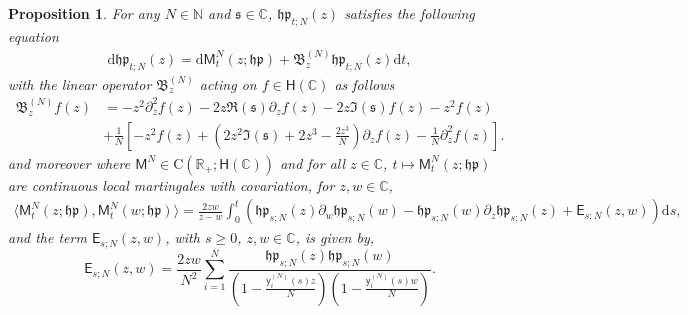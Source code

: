 \documentclass[]{article}
\newtheorem{prop}[thm]{Proposition}
\begin{document}
\begin{prop}\label{PropHPcharpolySDE}
    For any $N\in\mathbb{N}$ and $\mathfrak{s}\in\mathbb{C}$,
    $\mathfrak{hp}_{t;N}(z)$ satisfies the following equation
\begin{align}
\mathrm{d}\mathfrak{hp}_{t;N}(z)
    =
\mathrm{d}\mathsf{M}^N_t(z;\mathfrak{hp})
       +\mathfrak{B}^{(N)}_z\mathfrak{hp}_{t;N}(z)\mathrm{d}t,
\end{align}
with the linear operator $\mathfrak{B}^{(N)}_z$ acting on $f\in \mathsf{H}(\mathbb{C})$ as follows
\begin{align}
\mathfrak{B}^{(N)}_zf(z)&=-z^2\partial_z^2f(z)-2z\Re(\mathfrak{s})\partial_zf(z)-2z\Im(\mathfrak{s})f(z)-z^2f(z)\nonumber\\&+\frac{1}{N}\left[-z^2f(z)+\left(2z^2\Im(\mathfrak{s})+2z^3-\frac{2z^3}{N}\right)\partial_zf(z)-\frac{1}{N}\partial_z^2f(z)\right].
\end{align}
and moreover where $\mathsf{M}^N\in \mathrm{C}(\mathbb{R}_+;\mathsf{H}(\mathbb{C}))$ and for all $z\in \mathbb{C}$, $t\mapsto \mathsf{M}_t^N(z;\mathfrak{hp})$ are continuous local martingales with covariation, for $z,w \in \mathbb{C}$,
\begin{align}\label{HPQuadraticCovarFiniteN}
\langle \mathsf{M}_t^N(z;\mathfrak{hp}),\mathsf{M}_t^N(w;\mathfrak{hp})\rangle=\frac{2zw}{z-w}\int_0^t\left(\mathfrak{hp}_{s;N}(z)\partial_w\mathfrak{hp}_{s;N}(w)-\mathfrak{hp}_{s;N}(w)\partial_z\mathfrak{hp}_{s;N}(z)+\mathsf{E}_{s;N}(z,w)\right)\mathrm{d}s,
\end{align}
and the term $\mathsf{E}_{s;N}(z,w)$, with $s\ge 0$, $z,w\in \mathbb{C}$, is given by,
\begin{equation}\label{ErrorCovariance}
\mathsf{E}_{s;N}(z,w)=\frac{2zw}{N^2}\sum_{i=1}^N \frac{\mathfrak{hp}_{s;N}(z)\mathfrak{hp}_{s;N}(w)}{\left(1-\frac{\mathsf{y}_i^{(N)}(s)z}{N}\right)\left(1-\frac{\mathsf{y}_i^{(N)}(s)w}{N}\right)}.
\end{equation}
\end{prop}
\end{document}
